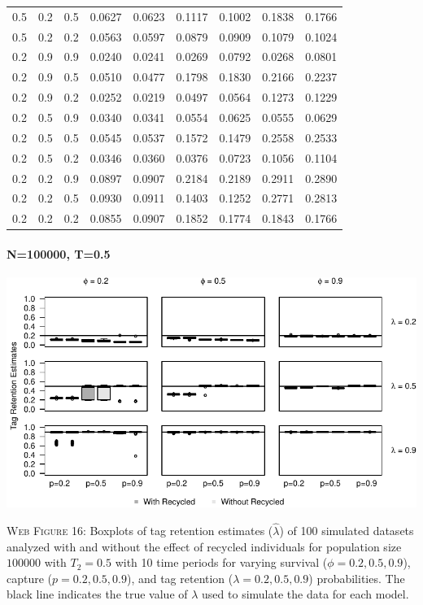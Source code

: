 \documentclass[]{article}
\let\oldparagraph\paragraph
\renewcommand{\paragraph}[1]{\oldparagraph{#1}\mbox{}}
\begin{document}
\begin{table}[ht]
{\begin{tabular}{rrrrrrrrr}
  0.5 & 0.2 & 0.5 & 0.0627 & 0.0623 & 0.1117 & 0.1002 & 0.1838 & 0.1766 \\ 
  0.5 & 0.2 & 0.2 & 0.0563 & 0.0597 & 0.0879 & 0.0909 & 0.1079 & 0.1024 \\ 
  0.2 & 0.9 & 0.9 & 0.0240 & 0.0241 & 0.0269 & 0.0792 & 0.0268 & 0.0801 \\ 
  0.2 & 0.9 & 0.5 & 0.0510 & 0.0477 & 0.1798 & 0.1830 & 0.2166 & 0.2237 \\ 
  0.2 & 0.9 & 0.2 & 0.0252 & 0.0219 & 0.0497 & 0.0564 & 0.1273 & 0.1229 \\ 
  0.2 & 0.5 & 0.9 & 0.0340 & 0.0341 & 0.0554 & 0.0625 & 0.0555 & 0.0629 \\ 
  0.2 & 0.5 & 0.5 & 0.0545 & 0.0537 & 0.1572 & 0.1479 & 0.2558 & 0.2533 \\ 
  0.2 & 0.5 & 0.2 & 0.0346 & 0.0360 & 0.0376 & 0.0723 & 0.1056 & 0.1104 \\ 
  0.2 & 0.2 & 0.9 & 0.0897 & 0.0907 & 0.2184 & 0.2189 & 0.2911 & 0.2890 \\ 
  0.2 & 0.2 & 0.5 & 0.0930 & 0.0911 & 0.1403 & 0.1252 & 0.2771 & 0.2813 \\ 
  0.2 & 0.2 & 0.2 & 0.0855 & 0.0907 & 0.1852 & 0.1774 & 0.1843 & 0.1766 \\ 
   \hline
\end{tabular}
}
\endgroup
\end{table}

\newpage

\paragraph{N=100000, T=0.5}\label{n100000-t0.5-2}

\includegraphics{Appendix_BW_files/figure-latex/figure16_tagretention_GJSTL3-1.pdf}

\textsc{Web Figure 16:} Boxplots of tag retention estimates
(\(\hat{\lambda}\)) of 100 simulated datasets analyzed with and without
the effect of recycled individuals for population size \(100000\) with
\(T_2=0.5\) with 10 time periods for varying survival
(\(\phi=0.2,0.5,0.9\)), capture (\(p=0.2,0.5,0.9\)), and tag retention
(\(\lambda=0.2,0.5,0.9\)) probabilities. The black line indicates the
true value of \(\lambda\) used to simulate the data for each model.
\end{document}
